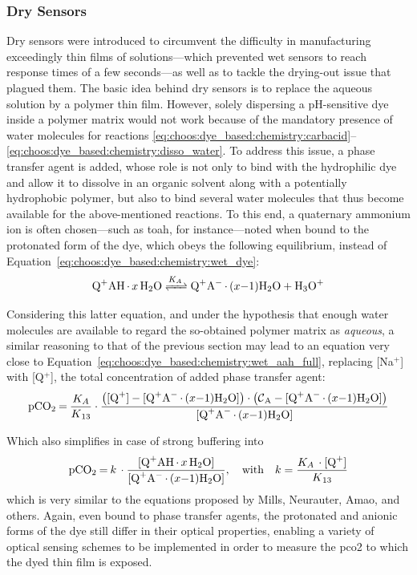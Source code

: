 \subsubsection{Dry Sensors}

Dry sensors were introduced to circumvent the difficulty in manufacturing exceedingly thin films of solutions---which prevented wet sensors to reach response times of a few seconds---as well as to tackle the drying-out issue that plagued them\cite{wolfbeis2005, mills2009}. The basic idea behind dry sensors is to replace the aqueous solution by a polymer thin film. However, solely dispersing a pH-sensitive dye inside a polymer matrix would not work because of the mandatory presence of water molecules for reactions \ref{eq:choos:dye_based:chemistry:carbacid}--\ref{eq:choos:dye_based:chemistry:disso_water}. To address this issue, a phase transfer agent is added, whose role is not only to bind with the hydrophilic dye and allow it to dissolve in an organic solvent along with a potentially hydrophobic polymer, but also to bind several water molecules that thus become available for the above-mentioned reactions\cite{mills2009}. To this end, a quaternary ammonium ion is often chosen---such as \gls{toah}, for instance\cite{amao2004}---noted  when bound to the protonated form of the dye, which obeys the following equilibrium, instead of Equation~\ref{eq:choos:dye_based:chemistry:wet_dye}:
\begin{equation}
	\ce{Q^+AH.$x$H_2O <=>[$K_A$] Q^+A^-.$(x-1)$H_2O + H_3O^+}
\end{equation}

Considering this latter equation, and under the hypothesis that enough water molecules are available to regard the so-obtained polymer matrix as \emph{aqueous}, a similar reasoning to that of the previous section may lead to an equation very close to Equation~\ref{eq:choos:dye_based:chemistry:wet_aah_full}, replacing [Na$^+$] with [Q$^+$], the total concentration of added phase transfer agent:
\begin{equation}\label{eq:choos:dye_based:chemistry:dry_aah_unbuff}
	\ce{pCO_2 = \frac{$K_A$}{$K$_{13}}}\cdot \frac{\left(\ce{[Q^+] - [Q^+A^-.$(x-1)$H_2O]}\right)\cdot\left(\ce{\mathcal{C}_A - [Q^+A^-.$(x-1)$H_2O]}\right)}{\ce{[Q^+A^-.$(x-1)$H_2O]}}
\end{equation}

Which also simplifies in case of strong buffering into
\begin{equation}\label{eq:choos:dye_based:chemistry:dry_aah_buff}
	\ce{pCO_2 = $k$ \cdot \frac{[Q^+AH.$x$H_2O]}{[Q^+A^-.$(x-1)$H_2O]}} , \quad \text{with} \quad k = \ce{\frac{$K_A$ \cdot [Q^+]}{$K$_{13}}}
\end{equation}
which is very similar to the equations proposed by Mills, Neurauter, Amao, and others\cite{mills1992, neurauter1999, amao2005b}. Again, even bound to phase transfer agents, the protonated and anionic forms of the dye still differ in their optical properties, enabling a variety of optical sensing schemes to be implemented in order to measure the \gls{pco2} to which the dyed thin film is exposed.

